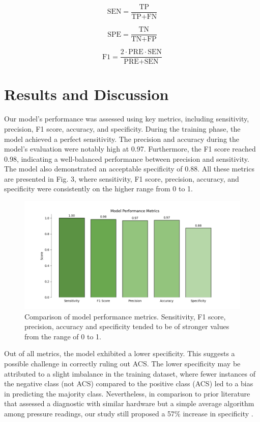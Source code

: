 \documentclass[times, twoside]{zHenriquesLab-StyleBioRxiv}
\begin{document}
\begin{equation}
\text{SEN} = \frac{\text{TP}}{\text{TP} + \text{FN}}
\end{equation}

\begin{equation}
\text{SPE} = \frac{\text{TN}}{\text{TN} + \text{FP}}
\end{equation}

\begin{equation}
\text{F1} = \frac{2 \cdot \text{PRE} \cdot \text{SEN}}{\text{PRE} + \text{SEN}}
\end{equation}

\section*{Results and Discussion}
Our model's performance was assessed using key metrics, including sensitivity, precision, F1 score, accuracy, and specificity. During the training phase, the model achieved a perfect sensitivity. The precision and accuracy during the model's evaluation were notably high at 0.97. Furthermore, the F1 score reached 0.98, indicating a well-balanced performance between precision and sensitivity. The model also demonstrated an acceptable specificity of 0.88. All these metrics are presented in Fig. 3, where sensitivity, F1 score, precision, accuracy, and specificity were consistently on the higher range from 0 to 1.

\begin{figure}[H] %
    \centering
    \includegraphics[width=1\linewidth]{performance.png}
    \caption{Comparison of model performance metrics. Sensitivity, F1 score, precision, accuracy and specificity tended to be of stronger values from the range of 0 to 1.}
    \label{fig:fig3}
\end{figure}

Out of all metrics, the model exhibited a lower specificity. This suggests a possible challenge in correctly ruling out ACS. The lower specificity may be attributed to a slight imbalance in the training dataset, where fewer instances of the negative class (not ACS) compared to the positive class (ACS) led to a bias in predicting the majority class. Nevertheless, in comparison to prior literature that assessed a diagnostic with similar hardware but a simple average algorithm among pressure readings, our study still proposed a 57\% increase in specificity \cite{ferrari2019sensei}.
\end{document}
